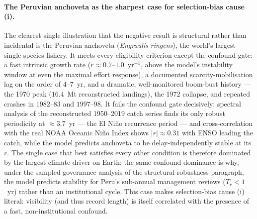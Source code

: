 \documentclass[twocolumn,10pt]{article}
\begin{document}
\paragraph{The Peruvian anchoveta as the sharpest case for selection-bias cause (i).} The clearest single illustration that the negative result is structural rather than incidental is the Peruvian anchoveta (\emph{Engraulis ringens}), the world's largest single-species fishery. It meets every eligibility criterion except the confound gate: a fast intrinsic growth rate ($r\approx0.7$--$1.0$~yr$^{-1}$, above the model's instability window at even the maximal effort response), a documented scarcity-mobilisation lag on the order of $4$--$7$~yr, and a dramatic, well-monitored boom-bust history --- the 1970 peak ($16.4$~Mt reconstructed landings), the 1972 collapse, and repeated crashes in $1982$--$83$ and $1997$--$98$. It fails the confound gate decisively: spectral analysis of the reconstructed 1950--2019 catch series finds its only robust periodicity at $\approx3.7$~yr --- the El Ni\~no recurrence period --- and cross-correlation with the real NOAA Oceanic Ni\~no Index shows $|r|\approx0.31$ with ENSO leading the catch, while the model predicts anchoveta to be delay-independently stable at its $r$. The single case that best satisfies every other condition is therefore dominated by the largest climate driver on Earth; the same confound-dominance is why, under the sampled-governance analysis of the structural-robustness paragraph, the model predicts stability for Peru's sub-annual management reviews ($T_r<1$~yr) rather than an institutional cycle. This case makes selection-bias cause (i) literal: visibility (and thus record length) is itself correlated with the presence of a fast, non-institutional confound.
\end{document}
